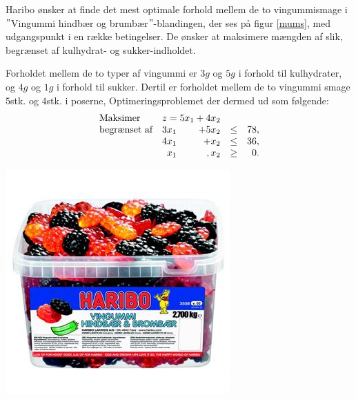 \begin{eks}
\label{haribooooo}


Haribo ønsker at finde det mest optimale forhold mellem de to vingummismage i $"$Vingummi hindbær og brumbær$"$-blandingen, der ses på figur \ref{mums}, med udgangspunkt i en række betingelser. 
De ønsker at maksimere mængden af slik, begrænset af kulhydrat- og sukker-indholdet.
\\
%
\begin{minipage}[b]{0.55\textwidth}
%
Forholdet mellem de to typer af vingummi er $3 g$ og $5 g$ i forhold til kulhydrater, og $4 g$ og $1 g$ i forhold til sukker. 
Dertil er forholdet mellem de to vingummi smage $5$stk. og $4$stk. i poserne, 
Optimeringsproblemet der dermed ud som følgende:
%
\begin{align*}
\begin{array}{lrrlr} 
\text{Maksimer}		&	\multicolumn{2}{c}{z=5x_1+4x_2}  &\\
\text{begrænset af}	&3x_1& +5x_2			&\leq 	&78,\\
					&4x_1& + x_2				&\leq	& 36,\\
					&x_1& , x_2				&\geq	& 0.
\end{array}
\end{align*}
%
\end{minipage}
%
\begin{minipage}[b]{0.4\textwidth}
%
\center
\includegraphics[scale=0.7]{fig/img/hindbaerbrombaer}
%
\label{mums}
\end{minipage}
%
\end{eks}

